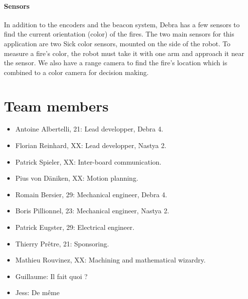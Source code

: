 \documentclass[a4paper]{paper}
\begin{document}
\paragraph{Sensors}
In addition to the encoders and the beacon system, Debra has a few sensors to find the current orientation (color) of the fires.
The two main sensors for this application are two Sick color sensors, mounted on the side of the robot.
To measure a fire's color, the robot must take it with one arm and approach it near the sensor.
We also have a range camera to find the fire's location which is combined to a color camera for decision making.


\section{Team members}
\begin{itemize}
    \item Antoine Albertelli, 21:  Lead developper, Debra 4.
    \item Florian Reinhard, XX:  Lead developper, Nastya 2.
    \item Patrick Spieler, XX:  Inter-board communication.
    \item Pius von Däniken, XX:  Motion planning.
    \item Romain Bersier, 29:  Mechanical engineer, Debra 4.
    \item Boris Pillionnel, 23:  Mechanical engineer, Nastya 2.
    \item Patrick Eugster, 29:  Electrical engineer.
    \item Thierry Prêtre, 21:  Sponsoring.
    \item Mathieu Rouvinez, XX:  Machining and mathematical wizardry.
    \item Guillaume:  Il fait quoi ?
    \item Jess:  De même
\end{itemize}
\end{document}

